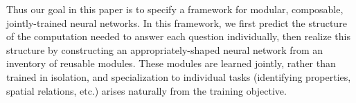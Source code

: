 Thus our goal in this paper is to specify a framework for modular, composable,
jointly-trained neural networks. In this framework, we first predict the
structure of the computation needed to answer each question individually, then
realize this structure by constructing an appropriately-shaped neural network
from an inventory of reusable modules. These modules are learned jointly, rather
than trained in isolation, and specialization to individual tasks (identifying
properties, spatial relations, etc.) arises naturally from the training
objective.

%
